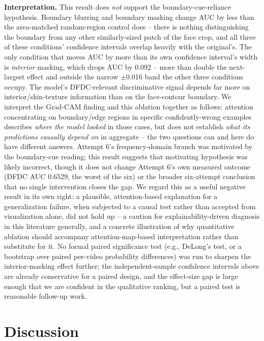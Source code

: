 \documentclass[conference]{IEEEtran}
\begin{document}
\textbf{Interpretation.} This result does \emph{not} support the
boundary-cue-reliance hypothesis. Boundary blurring and boundary masking
change AUC by less than the area-matched random-region control does --
there is nothing distinguishing the boundary from any other similarly-sized
patch of the face crop, and all three of these conditions' confidence
intervals overlap heavily with the original's. The only condition that
moves AUC by more than its own confidence interval's width is
\emph{interior} masking, which drops AUC by 0.092 -- more than double the
next-largest effect and outside the narrow $\pm$0.016 band the other three
conditions occupy. The model's DFDC-relevant discriminative signal depends
far more on interior/skin-texture information than on the face-contour
boundary. We interpret the Grad-CAM finding and this ablation together as
follows: attention concentrating on boundary/edge regions in specific
confidently-wrong examples describes \emph{where the model looked} in those
cases, but does not establish \emph{what its predictions causally depend
on} in aggregate -- the two questions can and here do have different
answers. Attempt 6's frequency-domain branch was motivated by the
boundary-cue reading; this result suggests that motivating hypothesis was
likely incorrect, though it does not change Attempt 6's own measured
outcome (DFDC AUC 0.6529, the worst of the six) or the broader six-attempt
conclusion that no single intervention closes the gap. We regard this as a
useful negative result in its own right: a plausible, attention-based
explanation for a generalization failure, when subjected to a causal test
rather than accepted from visualization alone, did not hold up -- a caution
for explainability-driven diagnosis in this literature generally, and a
concrete illustration of why quantitative ablation should accompany
attention-map-based interpretation rather than substitute for it. No formal
paired significance test (e.g., DeLong's test, or a bootstrap over paired
per-video probability differences) was run to sharpen the interior-masking
effect further; the independent-sample confidence intervals above are
already conservative for a paired design, and the effect-size gap is large
enough that we are confident in the qualitative ranking, but a paired test
is reasonable follow-up work.

\section{Discussion}
\end{document}
